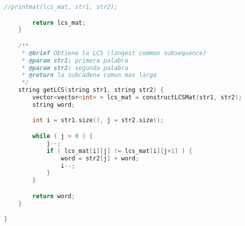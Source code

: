 \documentclass[10pt, a4paper]{article}
\theoremstyle{theorem-style}
\theoremstyle{theorem-style}
\theoremstyle{definition-style}
\theoremstyle{remark-style}
\theoremstyle{example-style}
\theoremstyle{definition-style}
\theoremstyle{remark-style}
\begin{document}
\begin{lstlisting}[language=C]
        //printmat(lcs_mat, str1, str2);

        return lcs_mat;
    }

    /**
     * @brief Obtiene la LCS (longest common subsequence)
     * @param str1: primera palabra
     * @param str2: segunda palabra
     * @return la subcadena comun mas larga
     */
    string getLCS(string str1, string str2) {
        vector<vector<int> > lcs_mat = constructLCSMat(str1, str2);
        string word;

        int i = str1.size(), j = str2.size();

        while ( j > 0 ) {
            j--;
            if ( lcs_mat[i][j] != lcs_mat[i][j+1] ) {
                word = str2[j] + word;
                i--;
            }
        }

        return word;
    }

}
\end{lstlisting}
\end{document}
